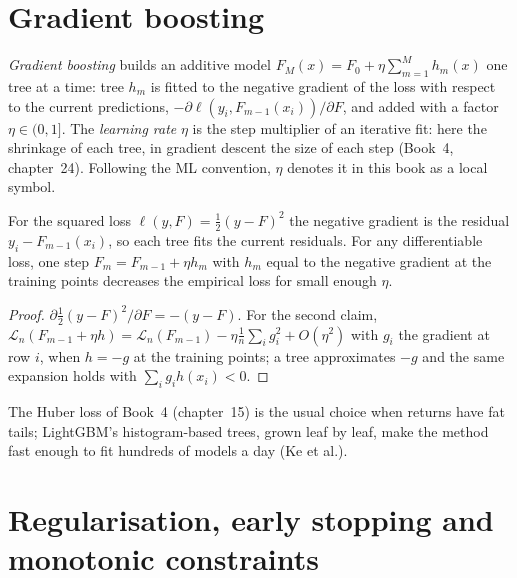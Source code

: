 \section{Gradient boosting}

\begin{definition}\label{def:ml:trees-and-boosting:boosting}
\emph{Gradient boosting} builds an additive model $F_M(x) = F_0 + \eta\sum_{m=1}^Mh_m(x)$ one
tree at a time: tree $h_m$ is fitted to the negative gradient of the loss with respect to the current predictions,
$-\partial\ell(y_i, F_{m-1}(x_i))/\partial F$, and added with a factor $\eta\in(0,1]$. The \emph{learning
rate} $\eta$ is the step multiplier of an iterative fit: here the shrinkage of each tree, in
gradient descent the size of each step (Book~4, chapter~24). Following the ML convention, $\eta$ denotes it in this
book as a local symbol.
\end{definition}

\begin{proposition}\label{prop:ml:trees:gradient}
For the squared loss $\ell(y, F) = \frac12(y - F)^2$ the negative gradient is the residual $y_i - F_{m-1}(x_i)$, so each
tree fits the current residuals. For any differentiable loss, one step $F_m = F_{m-1} + \eta h_m$ with $h_m$ equal to the
negative gradient at the training points decreases the empirical loss for small enough $\eta$.
\end{proposition}

\begin{proof}
$\partial\frac12(y - F)^2/\partial F = -(y - F)$. For the second claim, $\mathcal L_n(F_{m-1} + \eta h) =
\mathcal L_n(F_{m-1}) - \eta\frac1n\sum_ig_i^2 + O(\eta^2)$ with $g_i$ the gradient at row $i$, when $h = -g$ at the
training points; a tree approximates $-g$ and the same expansion holds with $\sum_ig_ih(x_i) < 0$.
\end{proof}

The Huber loss of Book~4 (chapter~15) is the usual choice when returns have fat tails; LightGBM's histogram-based trees,
grown leaf by leaf, make the method fast enough to fit hundreds of models a day (Ke et al.).

\section{Regularisation, early stopping and monotonic constraints}

